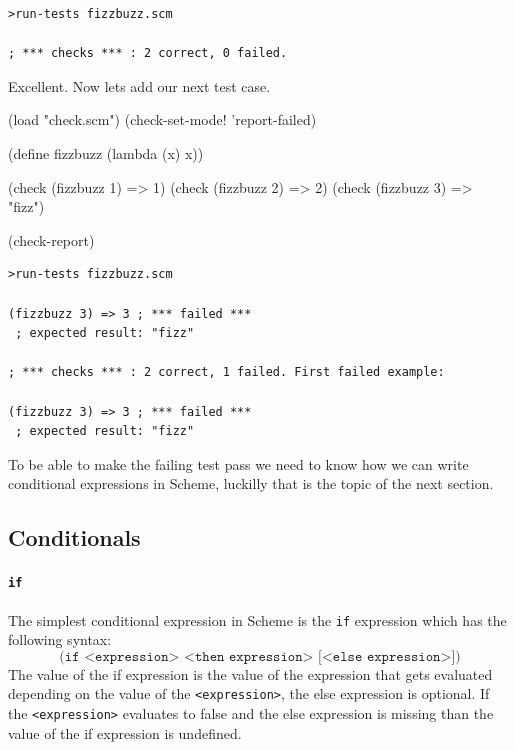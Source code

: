 \documentclass[12pt,a4paper,english,twoside]{article}
\begin{document}
\begin{lstlisting}
>run-tests fizzbuzz.scm

; *** checks *** : 2 correct, 0 failed.  \end{lstlisting}
Excellent. Now lets add our next test case.
\begin{schemecode}
(load "check.scm")
(check-set-mode! 'report-failed)

(define fizzbuzz (lambda (x) x))

(check (fizzbuzz 1) => 1)
(check (fizzbuzz 2) => 2)
(check (fizzbuzz 3) => "fizz")

(check-report)
\end{schemecode}
\begin{lstlisting}
>run-tests fizzbuzz.scm

(fizzbuzz 3) => 3 ; *** failed ***
 ; expected result: "fizz"

; *** checks *** : 2 correct, 1 failed. First failed example:

(fizzbuzz 3) => 3 ; *** failed ***
 ; expected result: "fizz"
\end{lstlisting}

To be able to make the failing test pass we need to know how we can write 
conditional expressions in Scheme, luckilly that is the topic of the next 
section.

\subsection{Conditionals}
\paragraph{\texttt{if}}
The simplest conditional expression in Scheme is the \texttt{if} expression 
which
has the following syntax:
\begin{equation*}
    \texttt{(if <expression> <then expression> [<else expression>])}
\end{equation*}
The value of the if expression is the value of the expression that gets 
evaluated depending on the value of the \texttt{<expression>}, the else 
expression is optional. If the \texttt{<expression>} evaluates to false and 
the else expression is missing than the value of the if expression is 
undefined.
\end{document}
